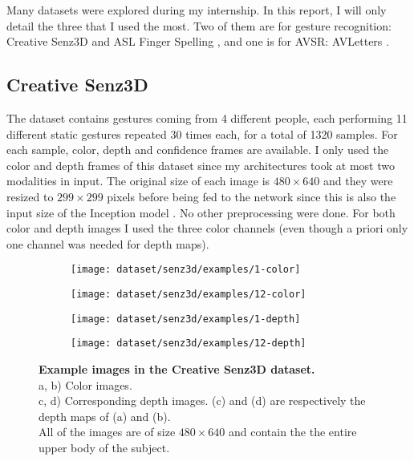 Many datasets were explored during my internship. In this report,
I will only detail the three that I used the most. Two of them are for
gesture recognition: Creative Senz3D \cite{A. Memo 2015, A. Memo 2017}
and ASL Finger Spelling \cite{N. Pugeault 2011}, and one is for AVSR:
AVLetters \cite{I. Matthews 2002}.

\subsection{Creative Senz3D}

The dataset contains gestures coming from 4 different people, each
performing 11 different static gestures repeated 30 times each,
for a total of 1320 samples.
For each sample, color, depth and confidence frames are available.
I only used the color and depth frames of this dataset since my
architectures took at most two modalities in input. The original
size of each image is $480 \times 640$ and they were resized to
$299 \times 299$ pixels before being fed to the network since this
is also the input size of the Inception model \cite{C. Szegedy 2017}.
No other preprocessing were done. For both color and depth images I used
the three color channels (even though a priori only one channel was needed
for depth maps).

\begin{figure}[H]
  \centering
  \hfill
  \begin{subfigure}{0.23\linewidth}
    \centering
    \texttt{[image: dataset/senz3d/examples/1-color]}
    \caption{}
  \end{subfigure}
  \hfill
  \begin{subfigure}{0.23\linewidth}
    \centering
    \texttt{[image: dataset/senz3d/examples/12-color]}
    \caption{}
  \end{subfigure}
  \hfill
  \begin{subfigure}{0.23\linewidth}
    \centering
    \texttt{[image: dataset/senz3d/examples/1-depth]}
    \caption{}
  \end{subfigure}
  \hfill
  \begin{subfigure}{0.23\linewidth}
    \centering
    \texttt{[image: dataset/senz3d/examples/12-depth]}
    \caption{}
  \end{subfigure}
  \caption{%
    \textbf{Example images in the Creative Senz3D dataset.}\\[0.1em]
    a, b) Color images.\\[0.1em]
    c, d) Corresponding depth images. (c) and (d) are respectively the
      depth maps of (a) and (b).\\[0.1em]
    All of the images are of size $480 \times 640$ and contain the
      the entire upper body of the subject.}
  \label{fig:senz3d_exs}
\end{figure}

